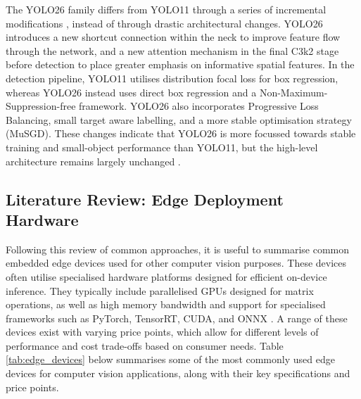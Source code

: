 The YOLO26 family differs from YOLO11 through a series of incremental modifications \cite{UltralyticsYOLO}, instead of through drastic architectural changes. YOLO26 introduces a new shortcut connection within the neck to improve feature flow through the network, and a new attention mechanism in the final C3k2 stage before detection to place greater emphasis on informative spatial features. In the detection pipeline, YOLO11 utilises distribution focal loss for box regression, whereas YOLO26 instead uses direct box regression and a Non-Maximum-Suppression-free framework. YOLO26 also incorporates Progressive Loss Balancing, small target aware labelling, and a more stable optimisation strategy (MuSGD). These changes indicate that YOLO26 is more focussed towards stable training and small-object performance than YOLO11, but the high-level architecture remains largely unchanged \cite{UltralyticsYOLO}.

\subsection{Literature Review: Edge Deployment Hardware}
\label{lit:edge_hardware}

Following this review of common approaches, it is useful to summarise common embedded edge devices used for other computer vision purposes. These devices often utilise specialised hardware platforms designed for efficient on-device inference. They typically include parallelised GPUs designed for matrix operations, as well as high memory bandwidth and support for specialised frameworks such as PyTorch, TensorRT, CUDA, and ONNX \cite{xu2025edge}. A range of these devices exist with varying price points, which allow for different levels of performance and cost trade-offs based on consumer needs. Table \ref{tab:edge_devices} below summarises some of the most commonly used edge devices for computer vision applications, along with their key specifications and price points.

